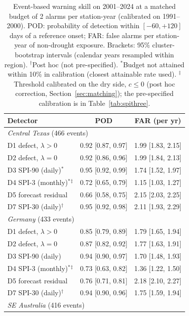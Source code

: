 \begin{table}[tbp]
\caption{Event-based warning skill on 2001--2024 at a matched budget of 2 alarms per
station-year (calibrated on 1991--2000). POD: probability of detection within $[-60,+120]$ days of a
reference onset; FAR: false alarms per station-year of non-drought exposure. Brackets: 95\%
cluster-bootstrap intervals (calendar years resampled within region). $^{\dagger}$Post hoc (not
pre-specified). $^{\ast}$Budget not attained within 10\% in calibration (closest attainable rate used).
$^{\ddagger}$Threshold calibrated on the dry side, $c\le0$ (post hoc correction,
Section~\ref{sec:matching}); the pre-specified calibration is in
Table~\ref{tab:spithree}.}
\label{tab:warning2}
\footnotesize\setlength{\tabcolsep}{2pt}
\begin{tabular*}{\textwidth}{@{\extracolsep\fill}lcc}
\toprule
Detector & POD & FAR (per yr)\\
\midrule
\multicolumn{3}{l}{\textit{Central Texas} (466 events)}\\
\quad D1 defect, $\lambda>0$ & 0.92 [0.87, 0.97] & 1.99 [1.83, 2.15] \\
\quad D2 defect, $\lambda=0$ & 0.92 [0.86, 0.96] & 1.99 [1.84, 2.13] \\
\quad D3 SPI-90 (daily)$^{\ast}$ & 0.95 [0.92, 0.99] & 1.74 [1.52, 1.97] \\
\quad D4 SPI-3 (monthly)$^{\ast}$$^{\ddagger}$ & 0.72 [0.65, 0.79] & 1.15 [1.03, 1.27] \\
\quad D5 forecast residual & 0.66 [0.58, 0.75] & 2.15 [2.03, 2.25] \\
\quad D7 SPI-30 (daily)$^{\dagger}$ & 0.95 [0.92, 0.98] & 2.11 [1.93, 2.29] \\
\midrule
\multicolumn{3}{l}{\textit{Germany} (433 events)}\\
\quad D1 defect, $\lambda>0$ & 0.85 [0.79, 0.89] & 1.79 [1.65, 1.94] \\
\quad D2 defect, $\lambda=0$ & 0.87 [0.82, 0.92] & 1.77 [1.63, 1.91] \\
\quad D3 SPI-90 (daily) & 0.94 [0.90, 0.97] & 1.70 [1.48, 1.93] \\
\quad D4 SPI-3 (monthly)$^{\ast}$$^{\ddagger}$ & 0.73 [0.63, 0.82] & 1.36 [1.22, 1.50] \\
\quad D5 forecast residual & 0.76 [0.71, 0.81] & 2.18 [2.10, 2.27] \\
\quad D7 SPI-30 (daily)$^{\dagger}$ & 0.94 [0.90, 0.96] & 1.75 [1.59, 1.94] \\
\midrule
\multicolumn{3}{l}{\textit{SE Australia} (416 events)}\\

\end{tabular*}
\end{table}
